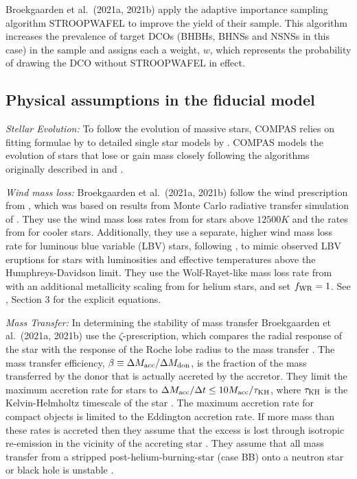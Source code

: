 Broekgaarden et al.\ (2021a, 2021b) apply the adaptive importance sampling algorithm STROOPWAFEL \citep{Broekgaarden+2019} to improve the yield of their sample. This algorithm increases the prevalence of target DCOs (BHBHs, BHNSs and NSNSs in this case) in the sample and assigns each a weight, $w$, which represents the probability of drawing the DCO without STROOPWAFEL in effect.

\subsection{Physical assumptions in the fiducial model}\label{app:fiducial_physics}

\textit{Stellar Evolution:} To follow the evolution of massive stars, COMPAS relies on fitting formulae by \citet{Hurley+2000} to detailed single star models by \citet{Pols+1998}. COMPAS models the evolution of stars that lose or gain mass closely following the algorithms originally described in \citet{Tout+1996} and \citet{Hurley+2002}.

\textit{Wind mass loss:} Broekgaarden et al.\ (2021a, 2021b) follow the wind prescription from \citet{Belczynski+2008}, which was based on results from Monte Carlo radiative transfer simulation of \citet{Vink+2000, Vink+2001}. They use the wind mass loss rates from \citet{Vink+2001} for stars above $12500 \unit{K}$ and the rates from \citet{Hurley+2000} for cooler stars. Additionally, they use a separate, higher wind mass loss rate for luminous blue variable (LBV) stars, following \citet{Belczynski+2008}, to mimic observed LBV eruptions for stars with luminosities and effective temperatures above the Humphreys-Davidson limit. They use the Wolf-Rayet-like mass loss rate from \citet{Hamann+1998} with an additional metallicity scaling from \citet{Vink+2005} for helium stars, and set $f_{\rm WR} = 1$. See \citet{COMPAS:2021methodsPaper}, Section 3 for the explicit equations.

\textit{Mass Transfer:} In determining the stability of mass transfer Broekgaarden et al.\ (2021a, 2021b) use the $\zeta$-prescription, which compares the radial response of the star with the response of the Roche lobe radius to the mass transfer \citep[e.g.][]{Hjellming+1987}. The mass transfer efficiency, $\beta \equiv \Delta M_{\rm acc} / \Delta M_{\rm don}$, is the fraction of the mass transferred by the donor that is actually accreted by the accretor. They limit the maximum accretion rate for stars to $\Delta M_{\rm acc} / \Delta t \le 10 M_{\rm acc} / \tau_{\rm KH}$, where $\tau_{\rm KH}$ is the Kelvin-Helmholtz timescale of the star \citep{Paczynski+1972, Hurley+2002}. The maximum accretion rate for compact objects is limited to the Eddington accretion rate. If more mass than these rates is accreted then they assume that the excess is lost through isotropic re-emission in the vicinity of the accreting star \citep[e.g.][]{Massevitch+1975, Soberman+1997}. They assume that all mass transfer from a stripped post-helium-burning-star (case BB) onto a neutron star or black hole is unstable \citep{Tauris+2015}.


